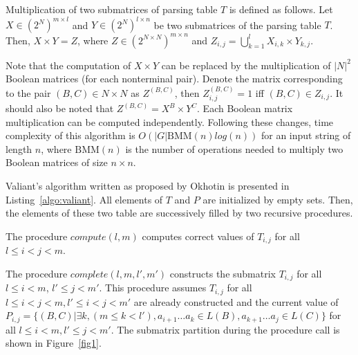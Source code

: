 Multiplication of two submatrices of parsing table $T$ is defined as follows.
Let $X \in (2^N)^{m \times l}$ and $Y \in (2^N)^{l \times n}$ be two submatrices of the parsing table $T$. 
Then, $X \times Y = Z$, where $Z \in (2^{N \times N})^{m \times n}$ and $Z_{i, j} = \bigcup\limits_{k = 1}^{l} X_{i, k} \times Y_{k, j}$.

Note that the computation of $X \times Y$  can be replaced by the multiplication of $|N|^2$ Boolean matrices (for each nonterminal pair).
Denote the matrix corresponding to the pair $(B, C) \in N \times N$ as $Z^{(B, C)}$, then $Z_{i, j}^{(B, C)} = 1$ iff $(B, C) \in Z_{i, j}$.
It should also be noted that $Z^{(B, C)} = X^{B} \times Y^{C}$.
Each Boolean matrix multiplication can be computed independently.
Following these changes, time complexity of this algorithm is $O(|G|\mathrm{BMM}(n)log(n))$ for an input string of length $n$, where $\mathrm{BMM}(n)$ is the number of operations needed to multiply two Boolean matrices of size $n \times n$.

Valiant's algorithm written as proposed by Okhotin is presented in Listing~\ref{algo:valiant}.
All elements of $T$ and $P$ are initialized by empty sets.
Then, the elements of these two table are successively filled by two recursive procedures.



The procedure $compute(l, m)$ computes correct values of $T_{i,j}$ for all $l \le i < j < m$.

The procedure $complete(l, m, l', m')$ constructs the submatrix $T_{i, j}$ for all $l \le i < m$, $l' \le j < m'$. This procedure assumes $T_{i, j}$ for all $l \leq i < j < m,  l' \leq i < j < m'$ are already constructed and the current value of  $P_{i, j} =  \{ (B, C) |\exists k, (m \le k < l'), a_{i + 1} \dots a_{k} \in L(B), a_{k + 1} \dots a_{j} \in L(C)\}$ for all $l \leq i < m,  l' \leq j < m'$.
The submatrix partition during the procedure call is shown in Figure~\ref{fig1}.


